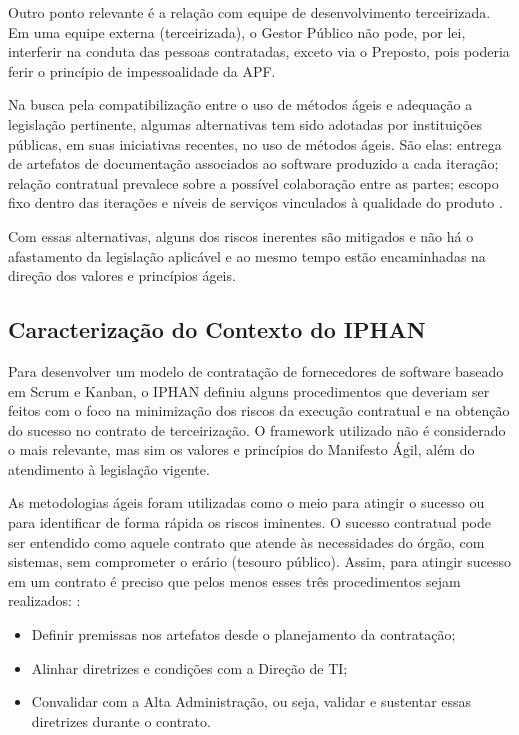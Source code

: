 Outro ponto relevante é a relação com equipe de desenvolvimento terceirizada. Em uma equipe externa (terceirizada), o Gestor Público não pode, por lei, interferir na conduta das pessoas contratadas, exceto via o Preposto, pois poderia ferir o princípio de impessoalidade da APF.

Na busca pela compatibilização entre o uso de métodos ágeis e adequação a legislação pertinente, algumas alternativas tem sido adotadas por instituições públicas, em suas iniciativas recentes, no uso de métodos ágeis. São elas: entrega de artefatos de documentação associados ao software produzido a cada iteração; relação contratual prevalece sobre a possível colaboração entre as partes; escopo fixo dentro das iterações e níveis de serviços vinculados à qualidade do produto   \cite{ruas}. 

Com essas alternativas, alguns dos riscos inerentes são mitigados e não há o afastamento da legislação aplicável e ao mesmo tempo estão encaminhadas na direção dos valores e princípios ágeis. 

\subsection[Caracterização do Contexto do IPHAN]{Caracterização do Contexto do IPHAN}

Para desenvolver um modelo de contratação de fornecedores de software baseado em Scrum e Kanban, o IPHAN definiu alguns procedimentos que deveriam ser feitos com o foco na minimização dos riscos da execução contratual e na obtenção do sucesso no contrato de terceirização. O framework utilizado não é considerado o mais relevante, mas sim os valores e princípios do Manifesto Ágil, além do atendimento à legislação vigente. 

As metodologias ágeis foram utilizadas como o meio para atingir o sucesso ou para identificar de forma rápida os riscos iminentes. O sucesso contratual pode ser entendido como aquele contrato que atende às necessidades do órgão, com sistemas, sem comprometer o erário (tesouro público). Assim, para atingir sucesso em um contrato é preciso que pelos menos esses três procedimentos sejam realizados: \cite{parente}:
\begin{itemize}
\item Definir premissas nos artefatos desde o planejamento da contratação;
\item Alinhar diretrizes e condições com a Direção de TI;
\item Convalidar com a Alta Administração, ou seja, validar e sustentar essas diretrizes durante o contrato.
\end{itemize}

